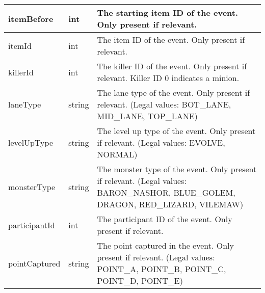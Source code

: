 \begin{table}[!h]
\begin{tabular}{llp{5cm}}
itemBefore              & int                & The starting item ID of the event. Only present if relevant.                                                                                                                                                                                \\ \hline
itemId                  & int                & The item ID of the event. Only present if relevant.                                                                                                                                                                                         \\ \hline
killerId                & int                & The killer ID of the event. Only present if relevant. Killer ID 0 indicates a minion.                                                                                                                                                       \\ \hline
laneType                & string             & The lane type of the event. Only present if relevant. (Legal values: BOT\_LANE, MID\_LANE, TOP\_LANE)                                                                                                                                       \\ \hline
levelUpType             & string             & The level up type of the event. Only present if relevant. (Legal values: EVOLVE, NORMAL)                                                                                                                                                    \\ \hline
monsterType             & string             & The monster type of the event. Only present if relevant. (Legal values: BARON\_NASHOR, BLUE\_GOLEM, DRAGON, RED\_LIZARD, VILEMAW)                                                                                                           \\ \hline
participantId           & int                & The participant ID of the event. Only present if relevant.                                                                                                                                                                                  \\ \hline
pointCaptured           & string             & The point captured in the event. Only present if relevant. (Legal values: POINT\_A, POINT\_B, POINT\_C, POINT\_D, POINT\_E)                                                                                                                 \\ \hline

\end{tabular}
\end{table}
